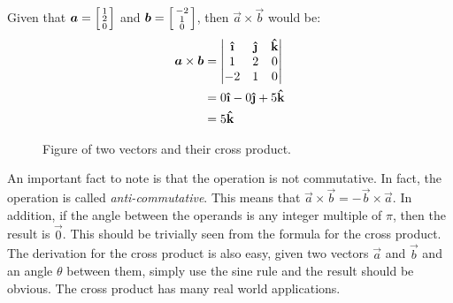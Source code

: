 \begin{example}
  Given that \(\vec{a}=\begin{bsmallmatrix}
    1 \\
    2 \\
    0 
  \end{bsmallmatrix} \) and \(\vec{b}=\begin{bsmallmatrix}
    -2 \\
    1 \\
    0
  \end{bsmallmatrix} \), then \(\vec{a}\times\vec{b}\) would be:
  \begin{align*}
    \vec{a}\times\vec{b} &= \begin{vmatrix}
      \ihat & \jhat & \khat \\
      1 & 2 & 0 \\
      -2 & 1 & 0
    \end{vmatrix} \\
    &= 0\ihat - 0\jhat + 5\khat \\
    &= 5\khat
  \end{align*}
  \begin{figure}[H]
    \centering
    \caption{Figure of two vectors and their cross product.}
  \end{figure}
\end{example}


An important fact to note is that the operation is not commutative. In fact, the operation is called \textit{anti-commutative}. This means that \(\vec{a}\times\vec{b}=-\vec{b}\times\vec{a}\). In addition, if the angle between the operands is any integer multiple of \(\pi\), then the result is \(\vec{0}\). This should be trivially seen from the formula for the cross product. The derivation for the cross product is also easy, given two vectors \(\vec{a}\) and \(\vec{b}\) and an angle \(\theta\) between them, simply use the sine rule and the result should be obvious. The cross product has many real world applications.
